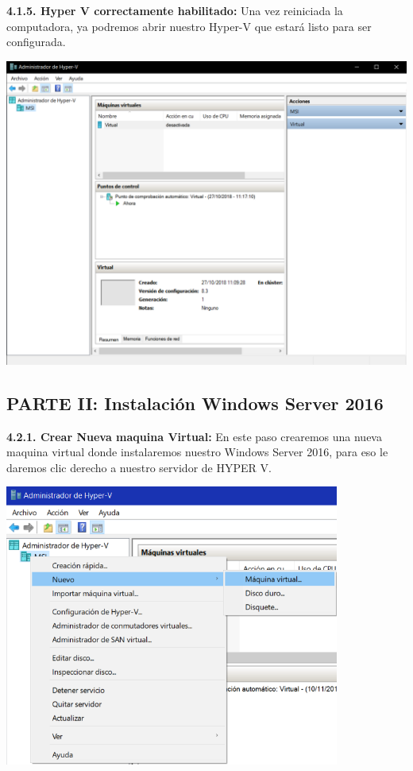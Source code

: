 \textbf {4.1.5. Hyper V correctamente habilitado:} Una vez reiniciada la computadora, ya podremos abrir nuestro Hyper-V que estará listo para ser configurada.\\
\begin{center}
  \includegraphics[width=14cm]{Imagenes/Hyper_V.png}
\end{center}
\break

\subsection{PARTE II: Instalación Windows Server 2016}

\textbf {4.2.1. Crear Nueva maquina Virtual:} En este paso crearemos una nueva maquina virtual donde instalaremos nuestro Windows Server 2016, para eso le daremos clic derecho a nuestro servidor de HYPER V.
\begin{center}
  \includegraphics[width=11cm]{Imagenes/Nueva_Maquina.png}
\end{center}

